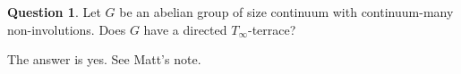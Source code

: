 \documentclass{amsart}
\theoremstyle{definition}
\newtheorem{question}{Question}
\theoremstyle{remark}
\newcommand{\R}{\mathbb{R}}
\newcommand{\st}{\; | \;}
\newcommand{\set}[2]{\left\{#1\st #2 \right\}}
\newcommand{\To}{\longrightarrow}
\renewcommand{\a}{\textup{\textbf{a}}}
\begin{document}
\begin{question} Let $G$ be an abelian group of size continuum with continuum-many non-involutions. Does $G$ have a directed $T_\infty$-terrace? \end{question}

The answer is yes. See Matt's note.
%
%
%
\end{document}

